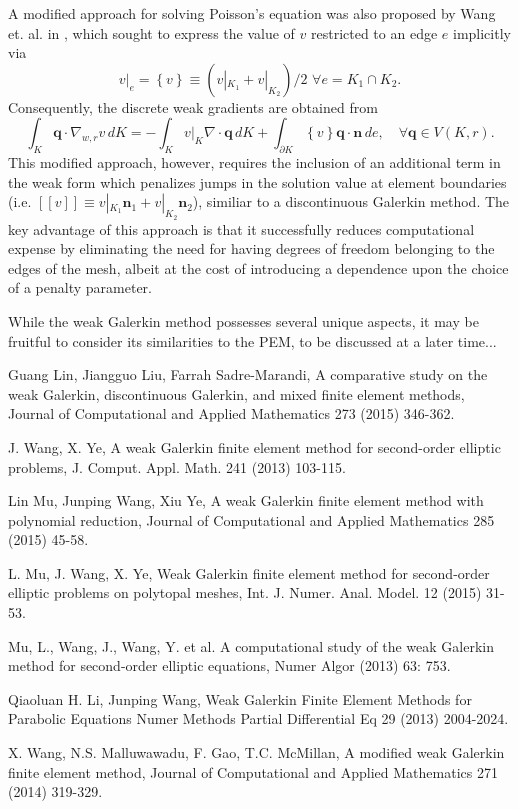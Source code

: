 \documentclass[11pt]{article} %
\begin{document}
A modified approach for solving Poisson's equation was also proposed by Wang et. al. in \cite{wg_modified}, which sought to express the value of $v$ restricted to an edge $e$ implicitly via
\begin{equation}
	v|_{e} = \left\{ v \right\} \equiv (v|_{K_1} + v|_{K_2})/2 \, \, \forall e = K_1 \cap K_2.
\end{equation}Consequently, the discrete weak gradients are obtained from
\begin{equation}
	\int_K \mathbf{q} \cdot \nabla_{w,r} v \, dK = - \int_K v|_K \nabla \cdot \mathbf{q} \, dK + \int_{\partial K} \left\{ v \right\} \mathbf{q} \cdot \mathbf{n} \, de, \quad \forall \mathbf{q} \in V( K, r ).
\end{equation}
This modified approach, however, requires the inclusion of an additional term in the weak form which penalizes jumps in the solution value at element boundaries (i.e. $[\![ v ]\!] \equiv v|_{K_1} \mathbf{n}_1 + v|_{K_2} \mathbf{n}_2$), similiar to a discontinuous Galerkin method. The key advantage of this approach is that it successfully reduces computational expense by eliminating the need for having degrees of freedom belonging to the edges of the mesh, albeit at the cost of introducing a dependence upon the choice of a penalty parameter.



While the weak Galerkin method possesses several unique aspects, it may be fruitful to consider its similarities to the PEM, to be discussed at a later time...

\begin{thebibliography}{9}

Guang Lin, Jiangguo Liu, Farrah Sadre-Marandi,
A comparative study on the weak Galerkin, discontinuous Galerkin, and mixed finite element methods,
Journal of Computational and Applied Mathematics 273 (2015) 346-362.

J. Wang, X. Ye,
A weak Galerkin finite element method for second-order elliptic problems,
J. Comput. Appl. Math. 241 (2013) 103-115.

Lin Mu, Junping Wang, Xiu Ye,
A weak Galerkin finite element method with polynomial reduction,
Journal of Computational and Applied Mathematics 285 (2015) 45-58.

L. Mu, J. Wang, X. Ye,
Weak Galerkin finite element method for second-order elliptic problems on polytopal meshes,
Int. J. Numer. Anal. Model. 12 (2015) 31-53.

Mu, L., Wang, J., Wang, Y. et al.
A computational study of the weak Galerkin method for second-order elliptic equations,
Numer Algor (2013) 63: 753.

Qiaoluan H. Li, Junping Wang,
Weak Galerkin Finite Element Methods for Parabolic Equations
Numer Methods Partial Differential Eq 29 (2013) 2004-2024.

X. Wang, N.S. Malluwawadu, F. Gao, T.C. McMillan,
A modified weak Galerkin finite element method,
Journal of Computational and Applied Mathematics 271 (2014) 319-329.

\end{thebibliography}
\end{document}
